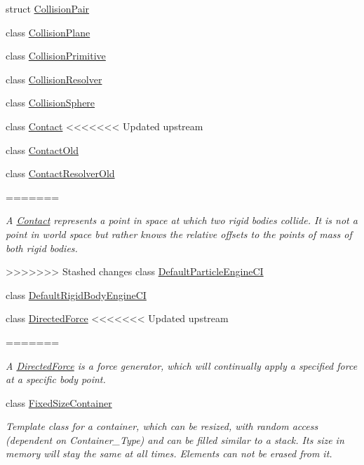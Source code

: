 \begin{DoxyCompactItemize}
struct \mbox{\hyperlink{structr3_1_1_collision_pair}{Collision\+Pair}}
\item 
class \mbox{\hyperlink{classr3_1_1_collision_plane}{Collision\+Plane}}
\item 
class \mbox{\hyperlink{classr3_1_1_collision_primitive}{Collision\+Primitive}}
\item 
class \mbox{\hyperlink{classr3_1_1_collision_resolver}{Collision\+Resolver}}
\item 
class \mbox{\hyperlink{classr3_1_1_collision_sphere}{Collision\+Sphere}}
\item 
class \mbox{\hyperlink{classr3_1_1_contact}{Contact}}
<<<<<<< Updated upstream
\item 
class \mbox{\hyperlink{classr3_1_1_contact_old}{Contact\+Old}}
\item 
class \mbox{\hyperlink{classr3_1_1_contact_resolver_old}{Contact\+Resolver\+Old}}
\item 
=======
\begin{DoxyCompactList}\small\item\em A \mbox{\hyperlink{classr3_1_1_contact}{Contact}} represents a point in space at which two rigid bodies collide. It is not a point in world space but rather knows the relative offsets to the points of mass of both rigid bodies. \end{DoxyCompactList}\item 
>>>>>>> Stashed changes
class \mbox{\hyperlink{classr3_1_1_default_particle_engine_c_i}{Default\+Particle\+Engine\+CI}}
\item 
class \mbox{\hyperlink{classr3_1_1_default_rigid_body_engine_c_i}{Default\+Rigid\+Body\+Engine\+CI}}
\item 
class \mbox{\hyperlink{classr3_1_1_directed_force}{Directed\+Force}}
<<<<<<< Updated upstream
\item 
=======
\begin{DoxyCompactList}\small\item\em A \mbox{\hyperlink{classr3_1_1_directed_force}{Directed\+Force}} is a force generator, which will continually apply a specified force at a specific body point. \end{DoxyCompactList}\item 
class \mbox{\hyperlink{classr3_1_1_fixed_size_container}{Fixed\+Size\+Container}}
\begin{DoxyCompactList}\small\item\em Template class for a container, which can be resized, with random access (dependent on Container\+\_\+\+Type) and can be filled similar to a stack. Its size in memory will stay the same at all times. Elements can not be erased from it. \end{DoxyCompactList}\item 

\end{DoxyCompactItemize}
